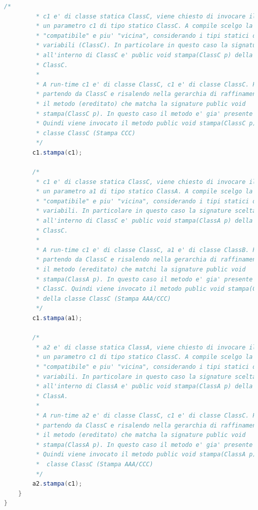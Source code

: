 \documentclass{article}
\begin{document}
\begin{lstlisting}[language=Java,escapechar=|]
		/*
		 * c1 e' di classe statica ClassC, viene chiesto di invocare il metodo stampa su
		 * un parametro c1 di tipo statico ClassC. A compile scelgo la signature
		 * "compatibile" e piu' "vicina", considerando i tipi statici delle
		 * variabili (ClassC). In particolare in questo caso la signature scelta
		 * all'interno di ClassC e' public void stampa(ClassC p) della classe
		 * ClassC.
		 * 
		 * A run-time c1 e' di classe ClassC, c1 e' di classe ClassC. Per questo
		 * partendo da ClassC e risalendo nella gerarchia di raffinamento cerco
		 * il metodo (ereditato) che matcha la signature public void 
		 * stampa(ClassC p). In questo caso il metodo e' gia' presente in ClassC. 
		 * Quindi viene invocato il metodo public void stampa(ClassC p) della 
		 * classe ClassC (Stampa CCC)
		 */
		c1.stampa(c1);
		
		/*
		 * c1 e' di classe statica ClassC, viene chiesto di invocare il metodo stampa su
		 * un parametro a1 di tipo statico ClassA. A compile scelgo la signature
		 * "compatibile" e piu' "vicina", considerando i tipi statici delle
		 * variabili. In particolare in questo caso la signature scelta
		 * all'interno di ClassC e' public void stampa(ClassA p) della classe
		 * ClassC.
		 * 
		 * A run-time c1 e' di classe ClassC, a1 e' di classe ClassB. Per questo
		 * partendo da ClassC e risalendo nella gerarchia di raffinamento cerco
		 * il metodo (ereditato) che matchi la signature public void 
		 * stampa(ClassA p). In questo caso il metodo e' gia' presente in 
		 * ClassC. Quindi viene invocato il metodo public void stampa(ClassA p) 
		 * della classe ClassC (Stampa AAA/CCC)
		 */
		c1.stampa(a1);

		/*
		 * a2 e' di classe statica ClassA, viene chiesto di invocare il metodo stampa su
		 * un parametro c1 di tipo statico ClassC. A compile scelgo la signature
		 * "compatibile" e piu' "vicina", considerando i tipi statici delle
		 * variabili. In particolare in questo caso la signature scelta
		 * all'interno di ClassA e' public void stampa(ClassA p) della classe
		 * ClassA.
		 * 
		 * A run-time a2 e' di classe ClassC, c1 e' di classe ClassC. Per questo
		 * partendo da ClassC e risalendo nella gerarchia di raffinamento cerco
		 * il metodo (ereditato) che matcha la signature public void
		 * stampa(ClassA p). In questo caso il metodo e' gia' presente in ClassC. 
		 * Quindi viene invocato il metodo public void stampa(ClassA p) della
		 *  classe ClassC (Stampa AAA/CCC)
		 */
		a2.stampa(c1);
	}
}
\end{lstlisting}
\end{document}
